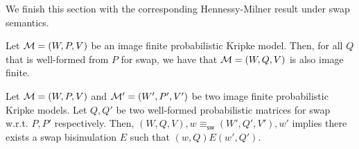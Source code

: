 We finish this section with the corresponding Hennessy-Milner result under swap semantics. 

\begin{remark}\label{rem:well-formed-swap}
   Let $\mathcal{M}=(W,P,V)$ be an image finite probabilistic Kripke model.  Then, for all ${Q}$ that is well-formed from $P$ for swap, we have that $\mathcal{M}=(W,{Q},V)$ is also image finite.
\end{remark}

\begin{theorem}
    Let $\mathcal{M}=(W,P,V)$ and $\mathcal{M}'=(W',P',V')$ be two image finite probabilistic Kripke models. Let ${Q},{Q'}$ be two well-formed probabilistic matrices for swap w.r.t. $P,P'$ respectively.  
    Then, $(W,{Q},V),w\equiv_{\mathsf{sw}}(W',{Q}',V'),w'$ implies there exists a swap bisimulation $E$ such that $(w,{Q})E(w',{Q}')$.
\end{theorem}
